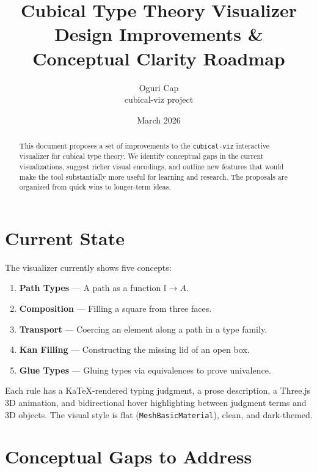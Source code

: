 \documentclass[11pt, a4paper]{article}
\title{
  \vspace{-1cm}
  \textbf{Cubical Type Theory Visualizer} \\
  \large Design Improvements \& Conceptual Clarity Roadmap
}
\author{Oguri Cap \\ \small cubical-viz project}
\date{March 2026}
\begin{document}
\maketitle

\begin{abstract}
This document proposes a set of improvements to the \texttt{cubical-viz} interactive
visualizer for cubical type theory. We identify conceptual gaps in the current
visualizations, suggest richer visual encodings, and outline new features that would
make the tool substantially more useful for learning and research. The proposals are
organized from quick wins to longer-term ideas.
\end{abstract}

\tableofcontents
\vspace{1em}

\section{Current State}

The visualizer currently shows five concepts:
\begin{enumerate}
  \item \textbf{Path Types} — A path as a function $\mathbb{I} \to A$.
  \item \textbf{Composition} — Filling a square from three faces.
  \item \textbf{Transport} — Coercing an element along a path in a type family.
  \item \textbf{Kan Filling} — Constructing the missing lid of an open box.
  \item \textbf{Glue Types} — Gluing types via equivalences to prove univalence.
\end{enumerate}

Each rule has a KaTeX-rendered typing judgment, a prose description, a Three.js 3D
animation, and bidirectional hover highlighting between judgment terms and 3D
objects. The visual style is flat (\texttt{MeshBasicMaterial}), clean, and dark-themed.

\section{Conceptual Gaps to Address}
\end{document}
